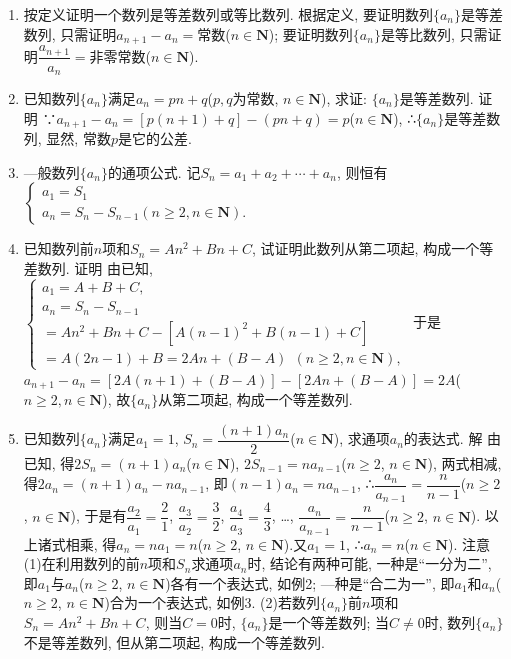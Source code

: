 \documentclass[10pt,a4paper]{article}
\begin{document}
\begin{enumerate}[1.]


\item 按定义证明一个数列是等差数列或等比数列.
根据定义, 要证明数列$\{a_n\}$是等差数列, 只需证明$a_{n+1}-a_n=$常数($n\in \mathbf{N}$); 要证明数列$\{a_n\}$是等比数列, 只需证明$\dfrac{{a_{n+1}}}{a_n}=$非零常数($n\in \mathbf{N}$).
\item 已知数列$\{a_n\}$满足$a_n=pn+q$($p,q$为常数, $n\in \mathbf{N}$), 求证: $\{a_n\}$是等差数列.
证明  ∵$a_{n+1}-a_n=[p(n+1)+q]-(pn+q)=p$($n\in \mathbf{N}$),
∴$\{a_n\}$是等差数列, 显然, 常数$p$是它的公差.
\item —般数列$\{a_n\}$的通项公式.
记$S_n=a_1+a_2+\cdots +a_n$, 则恒有$\begin{cases} a_1=S_1 \\ a_n=S_n-S_{n-1}(n\ge 2,n\in \mathbf{N}). \end{cases}$
\item 已知数列前$n$项和$S_n=An^2+Bn+C$, 试证明此数列从第二项起, 构成一个等差数列.
证明  由已知, $\begin{cases} a_1=A+B+C, \\ a_n=S_n-S_{n-1} \\ =An^2+Bn+C-[A(n-1)^2+B(n-1)+C] \\ =A(2n-1)+B=2An+(B-A)\ \ (n\ge 2,n\in \mathbf{N}),
\end{cases}$
于是$a_{n+1}-a_n=[2A(n+1)+(B-A)]-[2An+(B-A)]=2A$($n\ge 2,n\in \mathbf{N}$), 故$\{a_n\}$从第二项起, 构成一个等差数列.
\item 已知数列$\{a_n\}$满足$a_1=1$, $S_n=\dfrac{(n+1)a_n}2$($n\in \mathbf{N}$), 求通项$a_n$的表达式.
解  由已知, 得$2S_n=(n+1)a_n$($n\in \mathbf{N}$), $2S_{n-1}=na_{n-1}$($n\ge 2$, $n\in \mathbf{N}$),
两式相减, 得$2a_n=(n+1)a_n-na_{n-1}$, 即$(n-1)a_n=na_{n-1}$,
∴$\dfrac{a_n}{{a_{n-1}}}=\dfrac n{n-1}$($n\ge 2$, $n\in \mathbf{N}$),
于是有$\dfrac{a_2}{a_1}=\dfrac 21$, $\dfrac{a_3}{a_2}=\dfrac 32$, $\dfrac{a_4}{a_3}=\dfrac 43$, …, $\dfrac{a_n}{{a_{n-1}}}=\dfrac n{n-1}$($n\ge 2$, $n\in \mathbf{N}$).
以上诸式相乘, 得$a_n=na_1=n$($n\ge 2$, $n\in \mathbf{N}$).又$a_1=1$, ∴$a_n=n$($n\in \mathbf{N}$).
注意  (1)在利用数列的前$n$项和$S_n$求通项$a_n$时, 结论有两种可能, 一种是``一分为二'', 即$a_1$与$a_n$($n\ge 2$, $n\in \mathbf{N}$)各有一个表达式, 如例2; —种是``合二为一'', 即$a_1$和$a_n$($n\ge 2$, $n\in \mathbf{N}$)合为一个表达式, 如例3.
(2)若数列$\{a_n\}$前$n$项和$S_n=An^2+Bn+C$, 则当$C=0$时, $\{a_n\}$是一个等差数列; 当$C\ne 0$时, 数列$\{a_n\}$不是等差数列, 但从第二项起, 构成一个等差数列.


\end{enumerate}
\end{document}

